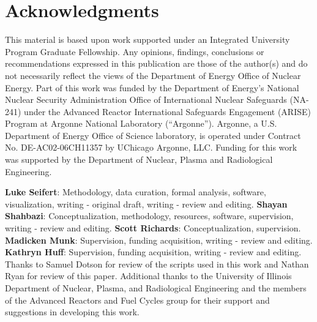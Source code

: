 \documentclass{style/nseJournal}
\begin{document}

\pagebreak
\section*{Acknowledgments}
This material is based upon work supported under an Integrated University Program Graduate
Fellowship.
Any opinions, findings, conclusions or recommendations expressed in this publication are
those of the author(s) and do not necessarily reflect the views of the Department of Energy
Office of Nuclear Energy.
Part of this work was funded by the Department of Energy’s National Nuclear Security Administration Office of International Nuclear Safeguards (NA-241) under the Advanced Reactor International Safeguards Engagement (ARISE) Program at Argonne National Laboratory (“Argonne”). Argonne, a U.S. Department of Energy Office of Science laboratory, is operated under Contract No. DE-AC02-06CH11357 by UChicago Argonne, LLC.
Funding for this work was supported by the Department of Nuclear, Plasma and Radiological Engineering.

\textbf{Luke Seifert}: Methodology, data curation, formal analysis, software, visualization, writing - original draft, writing - review and editing.
\textbf{Shayan Shahbazi}: Conceptualization, methodology, resources, software, supervision, writing - review and editing.
\textbf{Scott Richards}: Conceptualization, supervision.
\textbf{Madicken Munk}: Supervision, funding acquisition, writing - review and editing.
\textbf{Kathryn Huff}: Supervision, funding acquisition, writing - review and editing.
Thanks to Samuel Dotson for review of the scripts used in this work and Nathan Ryan for review of this paper.
Additional thanks to the University of Illinois Department of Nuclear, Plasma, and Radiological Engineering and the members of the Advanced Reactors and Fuel Cycles group for their support and suggestions in developing this work.


\pagebreak

\end{document}

